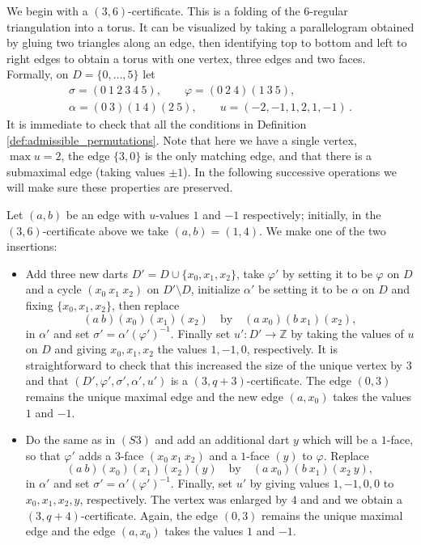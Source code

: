 \documentclass[11pt]{article}
\theoremstyle{remark}
\newcommand{\Z}{\mathbb Z}
\begin{document}
We begin with a $(3,6)$-certificate. This is a folding of the $6$-regular triangulation into a torus. It can be visualized by taking a parallelogram obtained by gluing two triangles along an edge, then identifying top to bottom and left to right edges to obtain a torus with one vertex, three edges and two faces. Formally, on $D=\{0,\dots,5\}$ let
\begin{equation}\label{eq:C36}
\begin{gathered}
 \sigma=(0\ 1\ 2\ 3\ 4\ 5),\qquad
 \varphi=(0\ 2\ 4)(1\ 3\ 5),\\
 \alpha=(0\ 3)(1\ 4)(2\ 5),\qquad
 u=(-2,-1,1,2,1,-1) \, .
\end{gathered}
\end{equation}
It is immediate to check that all the conditions in Definition \ref{def:admissible_permutations}. Note that here we have a single vertex, $\max u =2$, the edge $\{3,0\}$ is the only matching edge, and that there is a submaximal edge (taking values $\pm 1$). In the following successive operations we will make sure these properties are preserved. 

Let $(a,b)$ be an edge with $u$-values $1$ and $-1$ respectively; initially, in the $(3,6)$-certificate above we take $(a,b)=(1, 4)$. We make one of the two insertions:
\begin{itemize}
    \item[(S3)] Add three new darts $D' = D \cup \{x_0,x_1,x_2\}$, take $\varphi'$ by setting it to be $\varphi$ on $D$ and a cycle $(x_0\ x_1\ x_2)$ on $D'\setminus D$, initialize $\alpha'$ be setting it to be $\alpha$ on $D$ and fixing $\{x_0,x_1,x_2\}$, then replace    \begin{equation}\label{eq:S3}
       (a\ b)(x_0)(x_1)(x_2)
       \quad\text{by}\quad
       (a\ x_0)(b\ x_1)(x_2),
    \end{equation}
in $\alpha'$ and set $\sigma'= \alpha' (\varphi')^{-1}$. Finally set $u':D'\to \Z$ by taking the values of $u$ on $D$ and giving $x_0,x_1,x_2$ the values $1, -1, 0$, respectively. It is straightforward to check that this increased the size of the unique vertex by $3$ and that  $(D',\varphi', \sigma',\alpha', u')$ is a $(3,q+3)$-certificate. The edge $(0, 3)$ remains the unique maximal edge and the new edge $(a,x_0)$ takes the values $1$ and $-1$. 

\item[(S4)] Do the same as in $(S3)$ and add an additional dart $y$ which will be a $1$-face, so that $\varphi'$ adds a $3$-face $(x_0\ x_1\ x_2)$ and a $1$-face $(y)$ to $\varphi$. Replace 
\begin{equation}\label{eq:S4}
       (a\ b)(x_0)(x_1)(x_2)(y)
       \quad\text{by}\quad
       (a\ x_0)(b\ x_1)(x_2\ y),
\end{equation}
in $\alpha'$ and set $\sigma'= \alpha' (\varphi')^{-1}$. Finally, set $u'$ by giving values $1,-1,0,0$ to $x_0,x_1,x_2,y$, respectively. The vertex was enlarged by $4$ and and we obtain a $(3,q+4)$-certificate. Again, the edge $(0, 3)$ remains the unique maximal edge and the edge $(a,x_0)$ takes the values $1$ and $-1$. 
\end{itemize}
\end{document}
